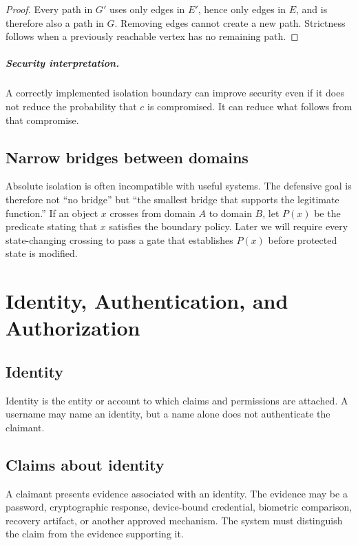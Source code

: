 \documentclass[11pt,oneside]{book}
\theoremstyle{definition}
\theoremstyle{remark}
\begin{document}
\begin{proof}
Every path in $G'$ uses only edges in $E'$, hence only edges in $E$, and is therefore also a path in $G$. Removing edges cannot create a new path. Strictness follows when a previously reachable vertex has no remaining path.
\end{proof}

\paragraph{Security interpretation.} A correctly implemented isolation boundary can improve security even if it does not reduce the probability that $c$ is compromised. It can reduce what follows from that compromise.

\section{Narrow bridges between domains}
Absolute isolation is often incompatible with useful systems. The defensive goal is therefore not ``no bridge'' but ``the smallest bridge that supports the legitimate function.'' If an object $x$ crosses from domain $A$ to domain $B$, let $P(x)$ be the predicate stating that $x$ satisfies the boundary policy. Later we will require every state-changing crossing to pass a gate that establishes $P(x)$ before protected state is modified.

\chapter{Identity, Authentication, and Authorization}
\label{ch:iaa}
\section{Identity}
Identity is the entity or account to which claims and permissions are attached. A username may name an identity, but a name alone does not authenticate the claimant.

\section{Claims about identity}
A claimant presents evidence associated with an identity. The evidence may be a password, cryptographic response, device-bound credential, biometric comparison, recovery artifact, or another approved mechanism. The system must distinguish the claim from the evidence supporting it.
\end{document}

